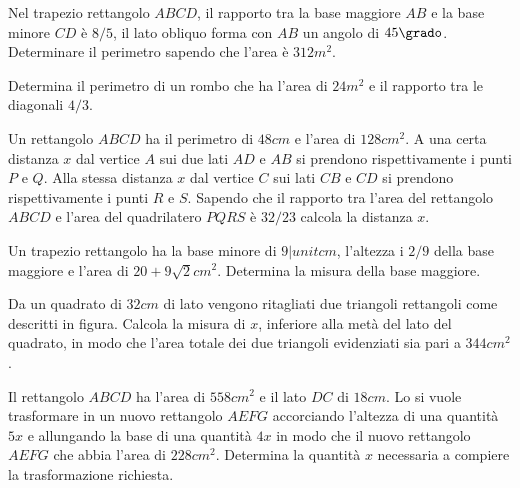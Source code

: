 \begin{multicols}{2}
\begin{esercizio}[\Ast]
 \label{ese:3.140}
Nel trapezio rettangolo $ ABCD $, il rapporto tra la base maggiore $ AB $ e la base
minore $ CD $ è $ 8/5 $, il lato obliquo forma con $ AB $ un angolo di $ 45\grado $. Determinare
il perimetro sapendo che l’area è $312\unit{m^2}$.
\end{esercizio}

\begin{esercizio}[\Ast]
 \label{ese:3.141}
Determina il perimetro di un rombo che ha l'area di $24\unit{m^2}$ e il rapporto tra
le diagonali $ 4/3 $.
\end{esercizio}

\begin{esercizio}[\Ast]
 \label{ese:3.142}
Un rettangolo $ ABCD $ ha il perimetro di $ 48\unit{cm} $ e l'area di $ 128\unit{cm^2} $. A una certa
distanza $x$ dal vertice $ A $ sui due lati $ AD $ e $ AB $ si prendono rispettivamente i
punti $ P $ e $ Q $. Alla stessa distanza $ x $ dal vertice $ C $ sui lati $ CB $ e $ CD $ si
prendono rispettivamente i punti $ R $ e $ S $. Sapendo che il rapporto tra l'area
del rettangolo $ ABCD $ e l'area del quadrilatero $ PQRS $ è $ 32/23 $ calcola la
distanza $x$.
\end{esercizio}

\begin{esercizio}
 \label{ese:3.143}
Un trapezio rettangolo ha la base minore di $ 9|unit{cm} $, l'altezza i $ 2/9 $ della base
maggiore e l'area di $20 + 9 \sqrt{2}\unit{cm^{2}}$. Determina la misura della base maggiore.
\end{esercizio}

\begin{esercizio}[\Ast]
 \label{ese:3.144}
Da un quadrato di $ 32\unit{cm} $ di lato vengono ritagliati due triangoli rettangoli
come descritti in figura. Calcola la misura di $ x $,
inferiore alla metà del lato del quadrato, in modo che l’area totale dei
due triangoli evidenziati sia pari a $ 344\unit{cm^2} $.
\begin{center}
 
\end{center}
\end{esercizio}

\begin{esercizio}[\Ast]
 \label{ese:3.145}
Il rettangolo $ ABCD $ ha l’area di $ 558\unit{cm^2} $ e il lato $ DC $ di $ 18\unit{cm} $. Lo si
vuole trasformare in un nuovo rettangolo $ AEFG $ accorciando l’altezza di una quantità $ 5x $ e allungando la base di
una quantità $ 4x $ in modo che il nuovo rettangolo $ AEFG $ che abbia l’area di
$ 228\unit{cm^2} $. Determina la quantità $ x $ necessaria a compiere la trasformazione
richiesta.
\end{esercizio}


\end{multicols}
